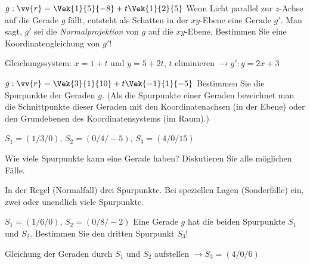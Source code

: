 \begin{exercise}
$g: \vv{r} = \Vek{1}{5}{-8} + t \Vek{1}{2}{5}$ \newline
Wenn Licht parallel zur $z$-Achse auf die Gerade $g$ fällt, entsteht als Schatten in der $xy$-Ebene eine Gerade $g'$. Man sagt, $g'$ sei die \textit{Normalprojektion} von $g$ auf die $xy$-Ebene. Bestimmen Sie eine Koordinatengleichung von $g'$!
\begin{answer}
Gleichungssystem: $x=1+t$ und $y=5+2t$, $t$ eliminieren $\rightarrow g': y=2x+3$
\end{answer}
\end{exercise}

\begin{exercise}
$g: \vv{r} = \Vek{3}{1}{10} + t \Vek{-1}{1}{-5}$ \newline
Bestimmen Sie die Spurpunkte der Geraden $g$. (Als die Spurpunkte einer Geraden bezeichnet man die Schnittpunkte dieser Geraden mit den Koordinatenachsen (in der Ebene) oder den Grundebenen des Koordinatensystems (im Raum).)
\begin{answer}
$S_{1} = (1/3/0)$, $S_{2} =(0/4/-5)$, $S_{3}=(4/0/15)$
\end{answer}
\end{exercise}

\begin{exercise}
Wie viele Spurpunkte kann eine Gerade haben? Diskutieren Sie alle möglichen Fälle.
\begin{answer}
In der Regel (Normalfall) drei Spurpunkte. Bei speziellen Lagen (Sonderfälle) ein, zwei oder unendlich viele Spurpunkte.
\end{answer}
\end{exercise}


\begin{exercise}
$S_{1} = (1/6/0)$, $S_{2} =(0/8/-2)$ \newline
Eine Gerade $g$ hat die beiden Spurpunkte $S_{1}$ und $S_{2}$. Bestimmen Sie den dritten Spurpunkt $S_{3}$!
\begin{answer}
Gleichung der Geraden durch $S_{1}$ und $S_{2}$ aufstellen $\rightarrow S_{3} = (4/0/6)$
\end{answer}
\end{exercise}

